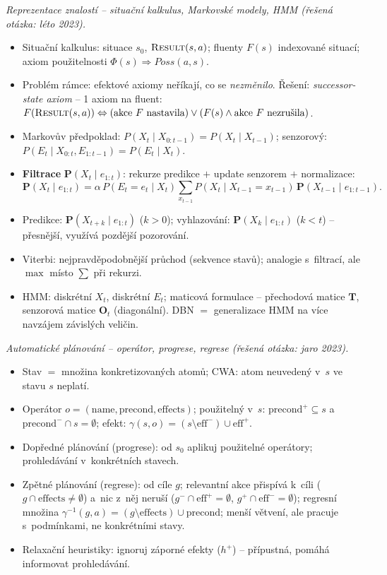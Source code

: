 \begin{poznamka}
\smallskip
\emph{Reprezentace znalostí -- situační kalkulus, Markovské modely, HMM (řešená otázka: léto 2023).}
\begin{itemize}
  \item Situační kalkulus: situace $s_0$, $\textsc{Result}(s,a)$; fluenty $F(s)$ indexované situací; axiom použitelnosti $\Phi(s)\Rightarrow\mathit{Poss}(a,s)$.
  \item Problém rámce: efektové axiomy neříkají, co se \emph{nezměnilo}. Řešení: \emph{successor-state axiom} -- 1 axiom na fluent: $F(\textsc{Result}(s,a))\Leftrightarrow(\text{akce }F\text{ nastavila})\vee(F(s)\wedge\text{akce }F\text{ nezrušila})$.
  \item Markovův předpoklad: $P(X_t\mid X_{0:t-1})=P(X_t\mid X_{t-1})$; senzorový: $P(E_t\mid X_{0:t},E_{1:t-1})=P(E_t\mid X_t)$.
  \item \textbf{Filtrace} $\mathbf{P}(X_t\mid e_{1:t})$: rekurze predikce $+$ update senzorem $+$ normalizace:
    \[ \mathbf{P}(X_t\mid e_{1:t})=\alpha\,P(E_t{=}e_t\mid X_t)\sum_{x_{t-1}}P(X_t\mid X_{t-1}{=}x_{t-1})\,\mathbf{P}(X_{t-1}\mid e_{1:t-1}). \]
  \item Predikce: $\mathbf{P}(X_{t+k}\mid e_{1:t})$ ($k>0$); vyhlazování: $\mathbf{P}(X_k\mid e_{1:t})$ ($k<t$) -- přesnější, využívá pozdější pozorování.
  \item Viterbi: nejpravděpodobnější průchod (sekvence stavů); analogie s~filtrací, ale $\max$ místo $\sum$ při rekurzi.
  \item HMM: diskrétní $X_t$, diskrétní $E_t$; maticová formulace -- přechodová matice $\mathbf{T}$, senzorová matice $\mathbf{O}_t$ (diagonální). DBN $=$ generalizace HMM na více navzájem závislých veličin.
\end{itemize}

\smallskip
\emph{Automatické plánování -- operátor, progrese, regrese (řešená otázka: jaro 2023).}
\begin{itemize}
  \item Stav $=$ množina konkretizovaných atomů; CWA: atom neuvedený v~$s$ ve stavu $s$ neplatí.
  \item Operátor $o=(\mathrm{name},\mathrm{precond},\mathrm{effects})$; použitelný v~$s$: $\mathrm{precond}^+\subseteq s$ a~$\mathrm{precond}^-\cap s=\emptyset$; efekt: $\gamma(s,o)=(s\setminus\mathrm{eff}^-)\cup\mathrm{eff}^+$.
  \item Dopředné plánování (progrese): od $s_0$ aplikuj použitelné operátory; prohledávání v~konkrétních stavech.
  \item Zpětné plánování (regrese): od cíle $g$; relevantní akce přispívá k~cíli ($g\cap\mathrm{effects}\neq\emptyset$) a~nic z~něj neruší ($g^-\cap\mathrm{eff}^+=\emptyset$, $g^+\cap\mathrm{eff}^-=\emptyset$); regresní množina $\gamma^{-1}(g,a)=(g\setminus\mathrm{effects})\cup\mathrm{precond}$; menší větvení, ale pracuje s~podmínkami, ne konkrétními stavy.
  \item Relaxační heuristiky: ignoruj záporné efekty ($h^+$) -- přípustná, pomáhá informovat prohledávání.
\end{itemize}


\end{poznamka}
